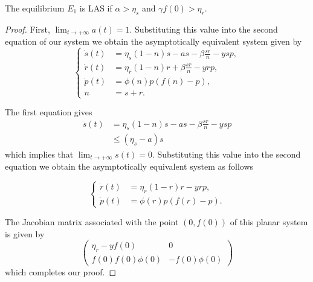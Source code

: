 \begin{theo}
	The equilibrium $E_1$ is LAS if $\alpha>\eta_s$ and $\gamma f(0) > \eta_r $.
\end{theo}
\begin{proof}
	First, \(\lim_{t \to +\infty} a(t) = 1\). Substituting this value into the second equation of our system we obtain the asymptotically equivalent system given by
	\begin{equation}
	\begin{cases}
		\dot{s}(t) &= \eta_s (1 - n)s - as - \beta \frac{sr}{n} - ysp, \\
		\dot{r}(t) &= \eta_r (1 - n)r + \beta \frac{sr}{n} - yrp, \\
		\dot{p}(t) &= \phi(n)p(f(n) - p), \\
		n &= s + r.
	\end{cases}
	\end{equation}
	
	The first equation gives
	\begin{align*}
		\dot{s}(t) &= \eta_s (1 - n)s - as - \beta \frac{sr}{n} - ysp \\
		&\leq (\eta_s - a)s
	\end{align*}
	which implies that \(\lim_{t \to +\infty} s(t) = 0\). Substituting this value into the second equation we obtain the asymptotically equivalent system as follows
	
	\begin{equation}
	\begin{cases}
		\dot{r}(t) &= \eta_r (1 - r)r - yrp, \\
		\dot{p}(t) &= \phi(r)p(f(r) - p).
	\end{cases}
	\end{equation}
	
	The Jacobian matrix associated with the point \((0, f(0))\) of this planar system is given by
	\[
	\begin{pmatrix}
		\eta_r - yf(0) & 0 \\
		f(0)f(0)\phi(0) & -f(0)\phi(0)
	\end{pmatrix}
	\]
	which completes our proof. \qedhere
\end{proof}

